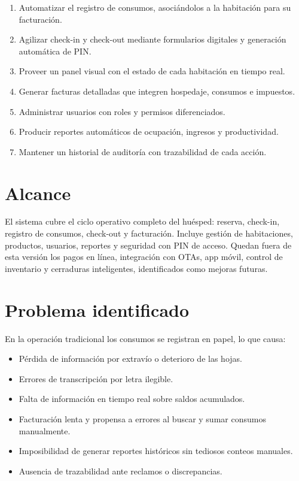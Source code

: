 \documentclass[12pt,a4paper]{article}
\begin{document}
\begin{enumerate}[leftmargin=*]
    \item Automatizar el registro de consumos, asociándolos a la habitación para su facturación.
    \item Agilizar check-in y check-out mediante formularios digitales y generación automática de PIN.
    \item Proveer un panel visual con el estado de cada habitación en tiempo real.
    \item Generar facturas detalladas que integren hospedaje, consumos e impuestos.
    \item Administrar usuarios con roles y permisos diferenciados.
    \item Producir reportes automáticos de ocupación, ingresos y productividad.
    \item Mantener un historial de auditoría con trazabilidad de cada acción.
\end{enumerate}

\section{Alcance}

El sistema cubre el ciclo operativo completo del huésped: reserva, check-in, registro de consumos, check-out y facturación. Incluye gestión de habitaciones, productos, usuarios, reportes y seguridad con PIN de acceso. Quedan fuera de esta versión los pagos en línea, integración con OTAs, app móvil, control de inventario y cerraduras inteligentes, identificados como mejoras futuras.

\section{Problema identificado}

En la operación tradicional los consumos se registran en papel, lo que causa:
\begin{itemize}[leftmargin=*]
    \item Pérdida de información por extravío o deterioro de las hojas.
    \item Errores de transcripción por letra ilegible.
    \item Falta de información en tiempo real sobre saldos acumulados.
    \item Facturación lenta y propensa a errores al buscar y sumar consumos manualmente.
    \item Imposibilidad de generar reportes históricos sin tediosos conteos manuales.
    \item Ausencia de trazabilidad ante reclamos o discrepancias.
\end{itemize}
\end{document}
